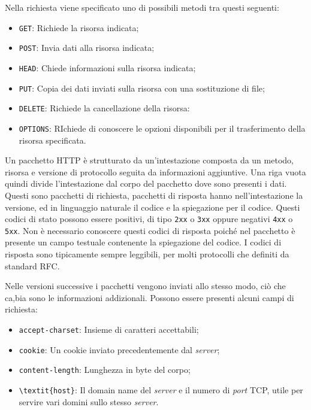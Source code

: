 \documentclass{article}
\numberwithin{equation}{subsection}
\begin{document}
Nella richiesta viene specificato uno di possibili metodi tra questi seguenti:
\begin{itemize}
    \item \verb|GET|: Richiede la risorsa indicata;
    \item \verb|POST|: Invia dati alla risorsa indicata;
    \item \verb|HEAD|: Chiede informazioni sulla risorsa indicata;
    \item \verb|PUT|: Copia dei dati inviati sulla risorsa con una sostituzione di file;
    \item \verb|DELETE|: Richiede la cancellazione della risorsa:
    \item \verb|OPTIONS|: RIchiede di conoscere le opzioni disponibili per il trasferimento della risorsa specificata. 
\end{itemize}


Un pacchetto \textcolor{NavyBlue}{HTTP} è strutturato da un'intestazione composta da un metodo, risorsa e versione di protocollo 
seguita da informazioni aggiuntive. Una riga vuota quindi divide l'intestazione dal corpo del pacchetto dove sono presenti i dati. 
Questi sono pacchetti di richiesta, pacchetti di risposta hanno nell'intestazione la versione, ed in linguaggio naturale il codice e la spiegazione per 
il codice. 
Questi codici di stato possono essere positivi, di tipo \verb|2xx| o \verb|3xx| oppure negativi \verb|4xx| o \verb|5xx|. Non è necessario conoscere questi codici di 
risposta poiché nel pacchetto è presente un campo testuale contenente la spiegazione del codice. 
I codici di risposta sono tipicamente sempre leggibili, per molti protocolli che definiti da standard RFC. 

Nelle versioni successive i pacchetti vengono inviati allo stesso modo, ciò che ca,bia sono le informazioni addizionali. 
Possono essere presenti alcuni campi di richiesta:
\begin{itemize}
    \item \verb|accept-charset|: Insieme di caratteri accettabili;
    \item \verb|cookie|: Un cookie inviato precedentemente dal \textit{server};
    \item \verb|content-length|: Lunghezza in byte del corpo;
    \item \verb|\textit{host}|: Il domain name del \textit{server} e il numero di \textit{port} \textcolor{Bittersweet}{TCP}, utile per servire vari domini sullo stesso \textit{server}. 
\end{itemize}
\end{document}
